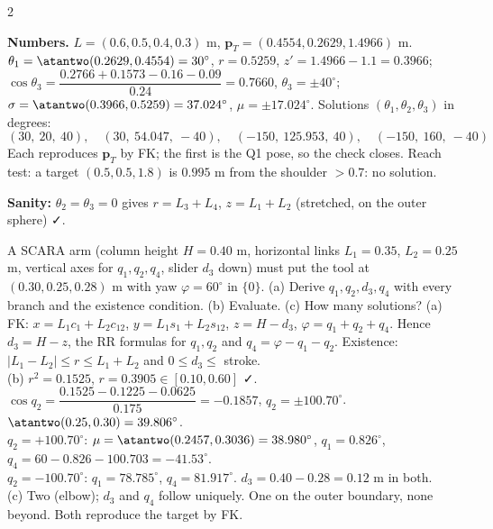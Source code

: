 \begin{multicols}{2}
\begin{examq}
\par \textbf{Numbers.} $L=(0.6,0.5,0.4,0.3)$ m, $\mathbf p_T=(0.4554,0.2629,1.4966)$ m. $\theta_1=\atantwo(0.2629,0.4554)=30^\circ$, $r=0.5259$, $z'=1.4966-1.1=0.3966$; $\cos\theta_3=\dfrac{0.2766+0.1573-0.16-0.09}{0.24}=0.7660$, $\theta_3=\pm40^\circ$; $\sigma=\atantwo(0.3966,0.5259)=37.024^\circ$, $\mu=\pm17.024^\circ$. Solutions $(\theta_1,\theta_2,\theta_3)$ in degrees:
\[(30,\ 20,\ 40),\quad(30,\ 54.047,\ -40),\quad(-150,\ 125.953,\ 40),\quad(-150,\ 160,\ -40)\]
Each reproduces $\mathbf p_T$ by FK; the first is the Q1 pose, so the check closes. Reach test: a target $(0.5,0.5,1.8)$ is $0.995$ m from the shoulder $>0.7$: no solution. \chk\par
\textbf{Sanity:} $\theta_2=\theta_3=0$ gives $r=L_3+L_4$, $z=L_1+L_2$ (stretched, on the outer sphere) ✓.
\end{examq}

\begin{examq}
A SCARA arm (column height $H=0.40$ m, horizontal links $L_1=0.35$, $L_2=0.25$ m, vertical axes for $q_1,q_2,q_4$, slider $d_3$ down) must put the tool at $(0.30,0.25,0.28)$ m with yaw $\varphi=60^\circ$ in $\{0\}$. (a) Derive $q_1,q_2,d_3,q_4$ with every branch and the existence condition. (b) Evaluate. (c) How many solutions?
\solution
(a) FK: $x=L_1c_1+L_2c_{12}$, $y=L_1s_1+L_2s_{12}$, $z=H-d_3$, $\varphi=q_1+q_2+q_4$. Hence $d_3=H-z$, the RR formulas for $q_1,q_2$ and $q_4=\varphi-q_1-q_2$. Existence: $|L_1-L_2|\le r\le L_1+L_2$ and $0\le d_3\le$ stroke.\\
(b) $r^2=0.1525$, $r=0.3905\in[0.10,0.60]$ ✓. $\cos q_2=\dfrac{0.1525-0.1225-0.0625}{0.175}=-0.1857$, $q_2=\pm100.70^\circ$. $\atantwo(0.25,0.30)=39.806^\circ$.\\
$q_2=+100.70^\circ$: $\mu=\atantwo(0.2457,0.3036)=38.980^\circ$, $q_1=0.826^\circ$, $q_4=60-0.826-100.703=-41.53^\circ$.\\
$q_2=-100.70^\circ$: $q_1=78.785^\circ$, $q_4=81.917^\circ$. $d_3=0.40-0.28=\mathbf{0.12}$ m in both.\\
(c) Two (elbow); $d_3$ and $q_4$ follow uniquely. One on the outer boundary, none beyond. Both reproduce the target by FK. \chk
\end{examq}


\end{multicols}

